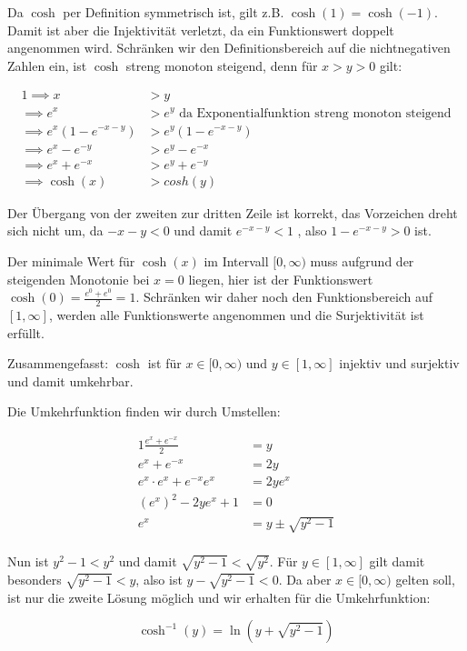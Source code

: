 \item Da $\cosh$ per Definition symmetrisch ist, gilt z.B. $\cosh(1) = \cosh(-1)$. Damit ist aber die Injektivität verletzt, da ein Funktionswert doppelt angenommen wird. Schränken wir den Definitionsbereich auf die nichtnegativen Zahlen ein, ist $\cosh$ streng monoton steigend, denn für $x>y>0$ gilt:

\begin{alignat*}{1}
	\implies x &> y \\
	\implies e^x &> e^y \text{ da Exponentialfunktion streng monoton steigend} \\
	\implies e^x (1-e^{-x-y}) &> e^y (1-e^{-x-y}) \\
	\implies e^x-e^{-y} &> e^y - e^{-x} \\
	\implies e^x + e^{-x} &> e^y + e^{-y} \\
	\implies \cosh(x) &> cosh(y)
\end{alignat*}

Der Übergang von der zweiten zur dritten Zeile ist korrekt, das Vorzeichen dreht sich nicht um, da $-x-y<0$ und damit $e^{-x-y} < 1$ , also $1-e^{-x-y} > 0$ ist.

Der minimale Wert für $\cosh(x)$ im Intervall $[0, \infty)$ muss aufgrund der steigenden Monotonie bei $x=0$ liegen, hier ist der Funktionswert $\cosh(0) = \frac{e^0+e^0}{2} = 1$. Schränken wir daher noch den Funktionsbereich auf $[1, \infty]$, werden alle Funktionswerte angenommen und die Surjektivität ist erfüllt.

Zusammengefasst: $\cosh$ ist für $x \in [0, \infty)$ und $y \in [1,\infty]$ injektiv und surjektiv und damit umkehrbar.

Die Umkehrfunktion finden wir durch Umstellen:

\begin{alignat*}{1}
	\frac{e^x+e^{-x}}{2} &= y \\
	 e^x+e^{-x} &= 2y \\
	 e^x \cdot e^x + e^{-x} e^x &= 2ye^x \\
	 (e^x)^2 - 2ye^x + 1 &= 0 \\
	 e^x &= y \pm \sqrt{y^2-1} \\
\end{alignat*}

Nun ist $y^2-1 < y^2$ und damit $\sqrt{y^2-1} < \sqrt{y^2}$. Für $y \in [1,\infty]$ gilt damit besonders $\sqrt{y^2-1} < y$, also ist $y - \sqrt{y^2-1} < 0$. Da aber $x \in [0, \infty)$ gelten soll, ist nur die zweite Lösung möglich und wir erhalten für die Umkehrfunktion:

$$
	\cosh^{-1}(y) = \ln(y + \sqrt{y^2-1})
$$